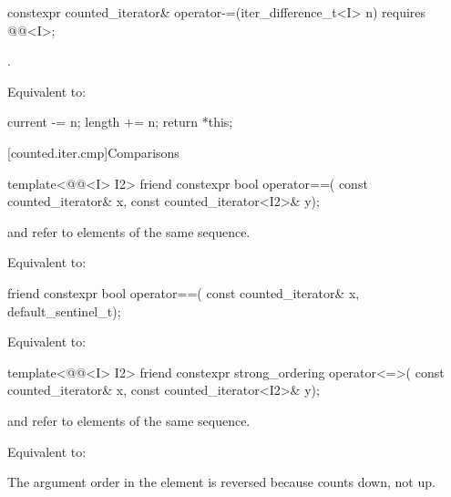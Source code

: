 %
\begin{itemdecl}
constexpr counted_iterator& operator-=(iter_difference_t<I> n)
  requires @@<I>;
\end{itemdecl}

\begin{itemdescr}
\pnum
\expects
{}.

\pnum
\effects
Equivalent to:
\begin{codeblock}
current -= n;
length += n;
return *this;
\end{codeblock}
\end{itemdescr}

[counted.iter.cmp]{Comparisons}

%
\begin{itemdecl}
template<@@<I> I2>
  friend constexpr bool operator==(
    const counted_iterator& x, const counted_iterator<I2>& y);
\end{itemdecl}

\begin{itemdescr}
\pnum
\expects
{} and  refer to
elements of the same sequence.

\pnum
\effects
Equivalent to: 
\end{itemdescr}

%
\begin{itemdecl}
friend constexpr bool operator==(
  const counted_iterator& x, default_sentinel_t);
\end{itemdecl}

\begin{itemdescr}
\pnum
\effects
Equivalent to: 
\end{itemdescr}

%
\begin{itemdecl}
template<@@<I> I2>
  friend constexpr strong_ordering operator<=>(
    const counted_iterator& x, const counted_iterator<I2>& y);
\end{itemdecl}

\begin{itemdescr}
\pnum
\expects
{} and  refer to
elements of the same sequence.

\pnum
\effects
Equivalent to: 

\pnum
\begin{note}
The argument order in the \effects element is reversed
because  counts down, not up.
\end{note}
\end{itemdescr}

